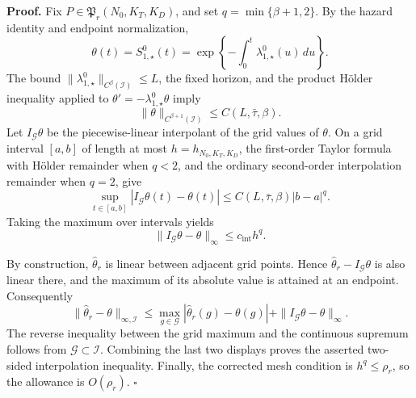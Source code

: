 \textbf{Proof.}
Fix \(P\in\mathfrak P_r(N_0,K_T,K_D)\), and set \(q=\min\{\beta+1,2\}\).  By the hazard identity and endpoint normalization,
\[
 \theta(t)=S^0_{1,\star}(t)
 =\exp\left\{-\int_0^t\lambda^0_{1,\star}(u)\,du\right\}.
\]
The bound \(\|\lambda^0_{1,\star}\|_{C^\beta(\mathcal I)}\le L\), the fixed horizon, and the product Hölder inequality applied to \(\theta'=-\lambda^0_{1,\star}\theta\) imply
\[
 \|\theta\|_{C^{\beta+1}(\mathcal I)}\le C(L,\bar\tau,\beta).
\]
Let \(I_{\mathcal G}\theta\) be the piecewise-linear interpolant of the grid values of \(\theta\).  On a grid interval \([a,b]\) of length at most \(h=h_{N_0,K_T,K_D}\), the first-order Taylor formula with Hölder remainder when \(q<2\), and the ordinary second-order interpolation remainder when \(q=2\), give
\[
 \sup_{t\in[a,b]}|I_{\mathcal G}\theta(t)-\theta(t)|
 \le C(L,\bar\tau,\beta)|b-a|^q.
\]
Taking the maximum over intervals yields
\[
 \|I_{\mathcal G}\theta-\theta\|_\infty\le c_{\mathrm{int}}h^q.
\]

By construction, \(\widehat\theta_r\) is linear between adjacent grid points.  Hence \(\widehat\theta_r-I_{\mathcal G}\theta\) is also linear there, and the maximum of its absolute value is attained at an endpoint.  Consequently
\[
 \|\widehat\theta_r-\theta\|_{\infty,\mathcal I}
 \le \max_{g\in\mathcal G}|\widehat\theta_r(g)-\theta(g)|
 +\|I_{\mathcal G}\theta-\theta\|_\infty.
\]
The reverse inequality between the grid maximum and the continuous supremum follows from \(\mathcal G\subset\mathcal I\).  Combining the last two displays proves the asserted two-sided interpolation inequality.  Finally, the corrected mesh condition is \(h^q\le\rho_r\), so the allowance is \(O(\rho_r)\). \(\square\)